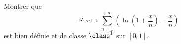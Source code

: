 \begin{enonce}
\begin{exercise}[ID={RMS135 E1457},subtitle={IMT MP 2024},tags={},difficulty={}]

Montrer que
\begin{equation*}
S : x \mapsto \sum_{n=1}^{+\infty} \left( \ln\left(1 + \frac{x}{n} \right) - \frac{x}{n} \right)
\end{equation*}
est bien définie et de classe $\class^1$ sur $[0, 1]$.

\end{exercise}
\begin{solution}
\end{solution}
\end{enonce}
